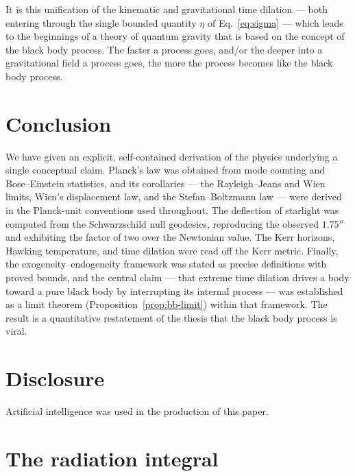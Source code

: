 \documentclass[10pt]{article}
\theoremstyle{definition}
\theoremstyle{remark}
\begin{document}
It is this unification of the kinematic and gravitational time dilation --- both entering through the single bounded quantity $\eta$ of Eq.~\eqref{eq:sigma} --- which leads to the beginnings of a theory of quantum gravity that is based on the concept of the black body process. The faster a process goes, and/or the deeper into a gravitational field a process goes, the more the process becomes like the black body process.

\section{Conclusion}

We have given an explicit, self-contained derivation of the physics underlying a single conceptual claim. Planck's law was obtained from mode counting and Bose--Einstein statistics, and its corollaries --- the Rayleigh--Jeans and Wien limits, Wien's displacement law, and the Stefan--Boltzmann law --- were derived in the Planck-unit conventions used throughout. The deflection of starlight was computed from the Schwarzschild null geodesics, reproducing the observed $1.75''$ and exhibiting the factor of two over the Newtonian value. The Kerr horizons, Hawking temperature, and time dilation were read off the Kerr metric. Finally, the exogeneity--endogeneity framework was stated as precise definitions with proved bounds, and the central claim --- that extreme time dilation drives a body toward a pure black body by interrupting its internal process --- was established as a limit theorem (Proposition~\ref{prop:bb-limit}) within that framework. The result is a quantitative restatement of the thesis that the black body process is viral.


\section{Disclosure}

Artificial intelligence was used in the production of this paper.






\appendix

\section{The radiation integral}\label{app:zeta}
\end{document}
